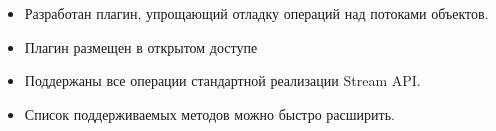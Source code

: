 \begin{frame}
\frametitle{\insertsection} 
\framesubtitle{\insertsubsection}
\begin{itemize}
	\item Разработан плагин, упрощающий отладку операций над потоками объектов.
	\item Плагин размещен в открытом доступе
	\item Поддержаны все операции стандартной реализации Stream API.
	\item Список поддерживаемых методов можно быстро расширить.
\end{itemize}
\end{frame}
 
